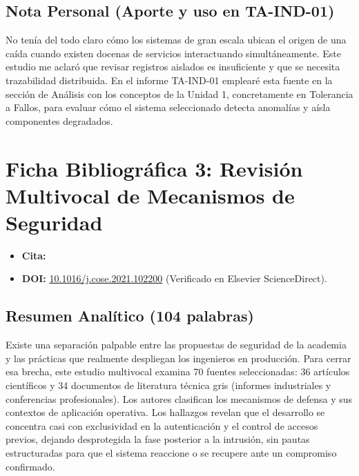 \documentclass[11pt,a4paper]{article}
\begin{document}
\subsection*{Nota Personal (Aporte y uso en TA-IND-01)}
No tenía del todo claro cómo los sistemas de gran escala ubican el origen de una caída cuando existen docenas de servicios interactuando simultáneamente. Este estudio me aclaró que revisar registros aislados es insuficiente y que se necesita trazabilidad distribuida. En el informe TA-IND-01 emplearé esta fuente en la sección de Análisis con los conceptos de la Unidad 1, concretamente en Tolerancia a Fallos, para evaluar cómo el sistema seleccionado detecta anomalías y aísla componentes degradados.

\newpage

\section{Ficha Bibliográfica 3: Revisión Multivocal de Mecanismos de Seguridad}

\begin{itemize}[leftmargin=1.2em]
    \item \textbf{Cita:} 
    \item \textbf{DOI:} \href{https://doi.org/10.1016/j.cose.2021.102200}{10.1016/j.cose.2021.102200} (Verificado en Elsevier ScienceDirect).
\end{itemize}

\subsection*{Resumen Analítico (104 palabras)}
Existe una separación palpable entre las propuestas de seguridad de la academia y las prácticas que realmente despliegan los ingenieros en producción. Para cerrar esa brecha, este estudio multivocal examina 70 fuentes seleccionadas: 36 artículos científicos y 34 documentos de literatura técnica gris (informes industriales y conferencias profesionales). Los autores clasifican los mecanismos de defensa y sus contextos de aplicación operativa. Los hallazgos revelan que el desarrollo se concentra casi con exclusividad en la autenticación y el control de accesos previos, dejando desprotegida la fase posterior a la intrusión, sin pautas estructuradas para que el sistema reaccione o se recupere ante un compromiso confirmado.
\end{document}
